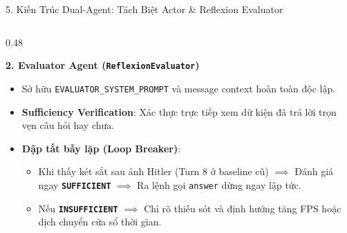 \documentclass[aspectratio=169, 10pt]{beamer}
\begin{document}
\begin{frame}{5. Kiến Trúc Dual-Agent: Tách Biệt Actor \& Reflexion Evaluator}
\begin{columns}[T]
        \begin{column}{0.48\textwidth}
            \begin{exampleblock}{\textbf{2. Evaluator Agent (\texttt{ReflexionEvaluator})}}
                \begin{itemize}
                    \item Sở hữu \texttt{EVALUATOR\_SYSTEM\_PROMPT} và message context hoàn toàn độc lập.
                    \item \textbf{Sufficiency Verification}: Xác thực trực tiếp xem dữ kiện đã trả lời trọn vẹn câu hỏi hay chưa.
                    \item \textbf{Dập tắt bẫy lặp (Loop Breaker)}:
                    \begin{itemize}\footnotesize
                        \item Khi thấy két sắt sau ảnh Hitler (Turn 8 ở baseline cũ) $\implies$ Đánh giá ngay \textbf{\texttt{SUFFICIENT}} $\implies$ Ra lệnh gọi \texttt{answer} dừng ngay lập tức.
                        \item Nếu \textbf{\texttt{INSUFFICIENT}} $\implies$ Chỉ rõ thiếu sót và định hướng tăng FPS hoặc dịch chuyển cửa sổ thời gian.
                    \end{itemize}
                \end{itemize}
            \end{exampleblock}
        \end{column}
    \end{columns}
\end{frame}
\end{document}
